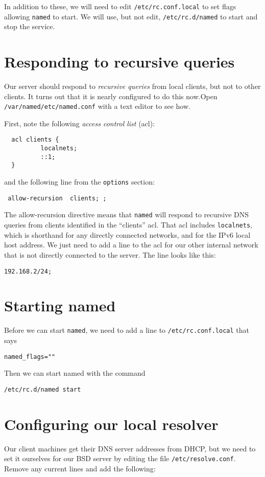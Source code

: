 \documentclass{article}
\begin{document}
In addition to these, we will need to edit \texttt{/etc/rc.conf.local} to set flags allowing \texttt{named} to start.  We will use, but not edit, \texttt{/etc/rc.d/named} to start and stop the service.

\section{Responding to recursive queries}
Our server should respond to \emph{recursive queries} from local clients, but not to other clients.  It turns out that it is nearly configured to do this now.Open \texttt{/var/named/etc/named.conf} with a text editor to see how.

First, note the following \emph{access control list} (acl):

\begin{verbatim}
  acl clients {
          localnets;
          ::1;
  }
\end{verbatim}

and the following line from the \texttt{options} section:

\texttt{ allow-recursion { clients; };}

The allow-recursion directive means that \texttt{named} will respond to recursive DNS queries from clients identified in the ``clients'' acl.  That acl includes \texttt{localnets}, which is shorthand for any directly connected networks, and for the IPv6 local host address.  We just need to add a line to the acl for our other internal network that is not directly connected to the server.  The line looks like this:

\texttt{192.168.2/24;}

\section{Starting named}
Before we can start \texttt{named}, we need to add a line to \texttt{/etc/rc.conf.local} that says

\texttt{named\_flags=""}

Then we can start named with the command 

\texttt{/etc/rc.d/named start}

\section{Configuring our local resolver}
Our client machines get their DNS server addresses from DHCP, but we need to set it ourselves for our BSD server by editing the file \texttt{/etc/resolve.conf}.  Remove any current lines and add the following:
\end{document}
